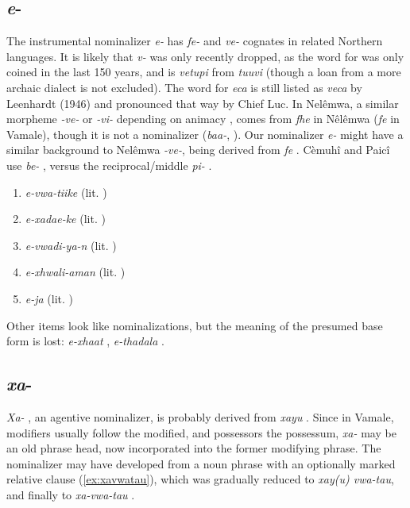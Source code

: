 \subsection{\textit{e}-}
\label{ssec:ins.nmlz}
The instrumental nominalizer \textit{e-} has \textit{fe-} and \textit{ve-} cognates in related Northern languages. It is likely that \textit{v-} was only recently dropped, as the word for  was only coined in the last 150 years, and is \textit{vetupi} from \textit{tuuvi}  (though a loan from a more archaic dialect is not excluded). The word for  \textit{eca} is still listed as \textit{veca} by Leenhardt (1946) and pronounced that way by Chief Luc. In Nelêmwa, a similar morpheme \textit{-ve-} or \textit{-vi-} depending on animacy \parencite[194]{bril_complex_2004}, comes from \textit{fhe}  in Nêlêmwa (\textit{fe} in Vamale), though it is not a nominalizer (\textit{baa-}, \citealt[74]{bril_nelemwa_2002}). Our nominalizer \textit{e-} might have a similar background to Nelêmwa \textit{-ve-}, being derived from \textit{fe} . Cèmuhî and Paicî use \textit{be-}  \parencites[257]{rivierre_langue_1980}[42]{rivierre_dictionnaire_1983}, versus the reciprocal/middle \textit{pi-} \parencites[257]{rivierre_langue_1980}[363]{rivierre_dictionnaire_1983}.

\begin{enumerate}
	\item \textit{e-vwa-tiike}  (lit. )
	\item \textit{e-xadae-ke}  (lit. )
	\item \textit{e-vwadi-ya-n}  (lit. )
	\item \textit{e-xhwali-aman}  (lit. )
	\item \textit{e-ja}  (lit. )
\end{enumerate}

Other items look like nominalizations, but the meaning of the presumed base form is lost: \textit{e-xhaat} , \textit{e-thadala} . 

\subsection{\textit{xa}-}
\label{ssec:agt.nmlz}
\textit{Xa-} , an agentive nominalizer, is probably derived from \textit{xayu} . Since in Vamale, modifiers usually follow the modified, and possessors the possessum, \textit{xa-} may be an old phrase head, now incorporated into the former modifying phrase. The nominalizer may have developed from a noun phrase with an optionally marked relative clause (\ref{ex:xavwatau}), which was gradually reduced to \textit{xay(u) vwa-tau}, and finally to \textit{xa-vwa-tau} .

